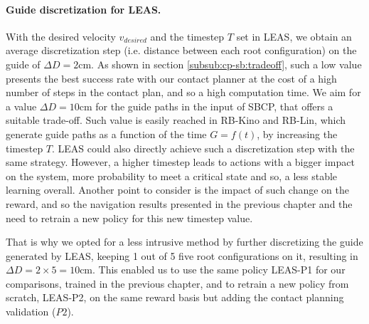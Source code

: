 \paragraph{Guide discretization for LEAS.\label{par:cpsb:discussion_guide_discretization}}
With the desired velocity $v_{desired}$ and the timestep $T$ set in LEAS, we obtain an average discretization step (i.e. distance between each root configuration) on the guide of $\Delta D=2$cm. 
As shown in section \ref{subsub:cp-sb:tradeoff}, such a low value presents the best success rate with our contact planner at the cost of a high number of steps in the contact plan, and so a high computation time. We aim for a value $\Delta D=10$cm for the guide paths in the input of SBCP, that offers a suitable trade-off.
Such value is easily reached in RB-Kino and RB-Lin, which generate guide paths as a function of the time $G=f(t)$, by increasing the timestep $T$.
LEAS could also directly achieve such a discretization step with the same strategy.
However, a higher timestep leads to actions with a bigger impact on the system, more probability to meet a critical state and so, a less stable learning overall.
Another point to consider is the impact of such change on the reward, and so the navigation results presented in the previous chapter and the need to retrain a new policy for this new timestep value.

That is why we opted for a less intrusive method by further discretizing the guide generated by LEAS, keeping 1 out of 5 five root configurations on it, resulting in $\Delta D=2 \times 5=10$cm.
This enabled us to use the same policy LEAS-P1 for our comparisons, trained in the previous chapter, and to retrain a new policy from scratch, LEAS-P2, on the same reward basis but adding the contact planning validation ($P2$).

